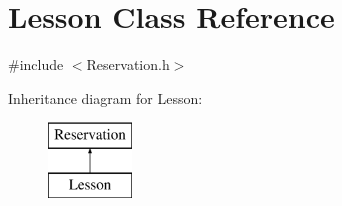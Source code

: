 \hypertarget{class_lesson}{}\section{Lesson Class Reference}
\label{class_lesson}


{\ttfamily \#include $<$Reservation.\+h$>$}

Inheritance diagram for Lesson\+:\begin{figure}[H]
\begin{center}
\leavevmode
\includegraphics[height=2.000000cm]{class_lesson}
\end{center}
\end{figure}
